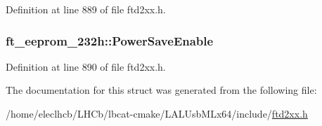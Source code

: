Definition at line 889 of file ftd2xx.h.\hypertarget{structft__eeprom__232h_a60637cdb433234aa02093455605abca9}{
\subsubsection[{PowerSaveEnable}]{ {\bf ft\_\-eeprom\_\-232h::PowerSaveEnable}}}
\label{structft__eeprom__232h_a60637cdb433234aa02093455605abca9}


Definition at line 890 of file ftd2xx.h.

The documentation for this struct was generated from the following file:\begin{DoxyCompactItemize}
\item 
/home/eleclhcb/LHCb/lbcat-\/cmake/LALUsbMLx64/include/\hyperlink{LALUsbMLx64_2include_2ftd2xx_8h}{ftd2xx.h}\end{DoxyCompactItemize}
